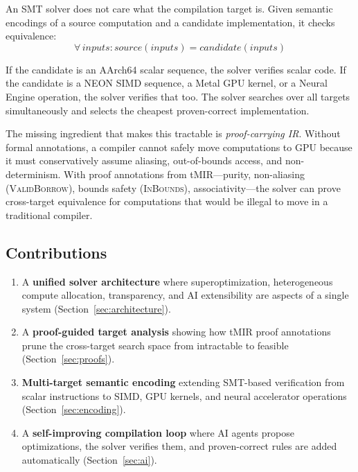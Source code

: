 \documentclass[11pt,twocolumn]{article}
\begin{document}
An SMT solver does not care what the compilation target is. Given semantic encodings of a source computation and a candidate implementation, it checks equivalence:
\begin{equation}
\forall\, \mathit{inputs}: \mathit{source}(\mathit{inputs}) = \mathit{candidate}(\mathit{inputs})
\label{eq:equiv}
\end{equation}

If the candidate is an AArch64 scalar sequence, the solver verifies scalar code. If the candidate is a NEON SIMD sequence, a Metal GPU kernel, or a Neural Engine operation, the solver verifies that too. The solver searches over all targets simultaneously and selects the cheapest proven-correct implementation.

The missing ingredient that makes this tractable is \emph{proof-carrying IR}. Without formal annotations, a compiler cannot safely move computations to GPU because it must conservatively assume aliasing, out-of-bounds access, and non-determinism. With proof annotations from tMIR---purity, non-aliasing (\textsc{ValidBorrow}), bounds safety (\textsc{InBounds}), associativity---the solver can prove cross-target equivalence for computations that would be illegal to move in a traditional compiler.

\subsection{Contributions}

\begin{enumerate}[leftmargin=*,topsep=4pt,itemsep=2pt]
\item A \textbf{unified solver architecture} where superoptimization, heterogeneous compute allocation, transparency, and AI extensibility are aspects of a single system (Section~\ref{sec:architecture}).
\item A \textbf{proof-guided target analysis} showing how tMIR proof annotations prune the cross-target search space from intractable to feasible (Section~\ref{sec:proofs}).
\item \textbf{Multi-target semantic encoding} extending SMT-based verification from scalar instructions to SIMD, GPU kernels, and neural accelerator operations (Section~\ref{sec:encoding}).
\item A \textbf{self-improving compilation loop} where AI agents propose optimizations, the solver verifies them, and proven-correct rules are added automatically (Section~\ref{sec:ai}).
\end{enumerate}
\end{document}
